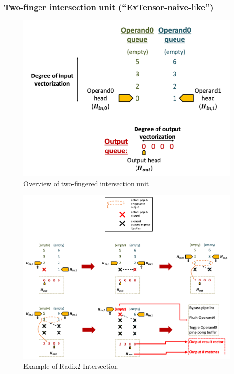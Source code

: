 \subsubsection{Two-finger intersection unit (``ExTensor-naive-like'')}

\begin{figure}[H]
    \centering
    \includegraphics[width=\linewidth]{figures/radix2_intersect_overview.png}
    \caption{Overview of two-fingered intersection unit}
    \label{fig:radix2-overview}
\end{figure}

\begin{figure}[H]
    \centering
    \includegraphics[width=\linewidth]{figures/radix2_intersect_example.png}
    \caption{Example of Radix2 Intersection}
    \label{fig:radix2-example}
\end{figure}


